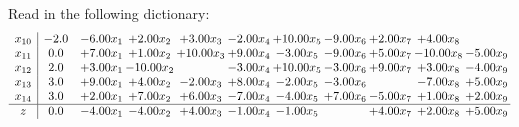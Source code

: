 \documentclass[9pt]{article}
\begin{document}
Read in the following dictionary:
\[\begin{array}{c| c c@{\hskip 2pt} c@{\hskip 2pt} c@{\hskip 2pt} c@{\hskip 2pt} c@{\hskip 2pt} c@{\hskip 2pt} c@{\hskip 2pt} c@{\hskip 2pt} c@{\hskip 2pt} }
 x_{10}   &  -2.0 & -6.00 x_{1} & +  2.00 x_{2} & +  3.00 x_{3} & -2.00 x_{4} & + 10.00 x_{5} & -9.00 x_{6} & +  2.00 x_{7} & +  4.00 x_{8} &   \\
 x_{11}   &  0.0 & +  7.00 x_{1} & +  1.00 x_{2} & + 10.00 x_{3} & +  9.00 x_{4} & -3.00 x_{5} & -9.00 x_{6} & +  5.00 x_{7} & -10.00 x_{8} & -5.00 x_{9}\\
 x_{12}   &  2.0 & +  3.00 x_{1} & -10.00 x_{2} &   & -3.00 x_{4} & + 10.00 x_{5} & -3.00 x_{6} & +  9.00 x_{7} & +  3.00 x_{8} & -4.00 x_{9}\\
 x_{13}   &  3.0 & +  9.00 x_{1} & +  4.00 x_{2} & -2.00 x_{3} & +  8.00 x_{4} & -2.00 x_{5} & -3.00 x_{6} &   & -7.00 x_{8} & +  5.00 x_{9}\\
 x_{14}   &  3.0 & +  2.00 x_{1} & +  7.00 x_{2} & +  6.00 x_{3} & -7.00 x_{4} & -4.00 x_{5} & +  7.00 x_{6} & -5.00 x_{7} & +  1.00 x_{8} & +  2.00 x_{9}\\
\hline
z    &  0.0 & -4.00 x_{1} & -4.00 x_{2} & +  4.00 x_{3} & -1.00 x_{4} & -1.00 x_{5} &   & +  4.00 x_{7} & +  2.00 x_{8} & +  5.00 x_{9}\\
\end{array}\]
\end{document}
